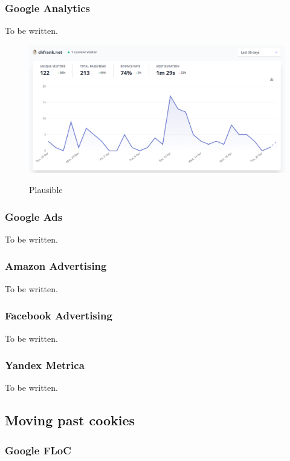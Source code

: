 \subsubsection{Google Analytics}

To be written.

\begin{figure}[H]
\centering
\caption {Plausible}
\includegraphics[width=\linewidth]{images/plausible.png}
\label{fig:plausible}
\end{figure}

\subsubsection{Google Ads}

To be written.

\subsubsection{Amazon Advertising}

To be written.

\subsubsection{Facebook Advertising}

To be written.

\subsubsection{Yandex Metrica}

To be written.

\subsection{Moving past cookies}

\subsubsection{Google FLoC}

